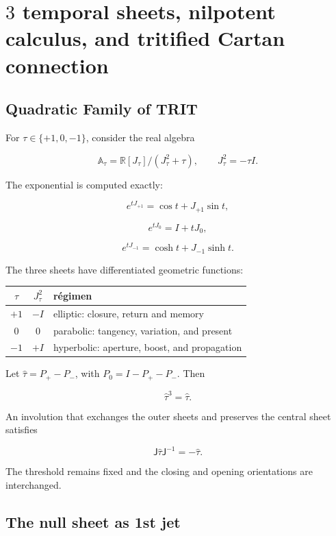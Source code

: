 \chapter{\(3\) temporal sheets, nilpotent calculus, and tritified Cartan connection}
\label{chap:tres-hojas-variacion}

\section{Quadratic Family of TRIT}

For \(\tau\in\{+1,0,-1\}\), consider the real algebra

\[
\mathbb A_\tau=\mathbb R[J_\tau]/(J_\tau^2+\tau),
\qquad
J_\tau^2=-\tau I.
\]

The exponential is computed exactly:

\[
e^{tJ_{+1}}=\cos t+J_{+1}\sin t,
\]

\[
e^{tJ_0}=I+tJ_0,
\]

\[
e^{tJ_{-1}}=\cosh t+J_{-1}\sinh t.
\]

The three sheets have differentiated geometric functions:

\begin{center}
\begin{tabular}{ccl}
\toprule
\(\tau\)&\(J_\tau^2\)&r\'egimen\\
\midrule
\(+1\)&\(-I\)&elliptic: closure, return and memory\\
\(0\)&\(0\)&parabolic: tangency, variation, and present\\
\(-1\)&\(+I\)&hyperbolic: aperture, boost, and propagation\\
\bottomrule
\end{tabular}
\end{center}

Let \(\widehat\tau=P_+-P_-\), with \(P_0=I-P_+-P_-\). Then

\[
\widehat\tau^3=\widehat\tau.
\]

An involution that exchanges the outer sheets and preserves the central sheet
satisfies

\[
\mathsf J\widehat\tau\mathsf J^{-1}=-\widehat\tau.
\]

The threshold remains fixed and the closing and opening orientations are interchanged.

\section{The null sheet as 1st jet}

